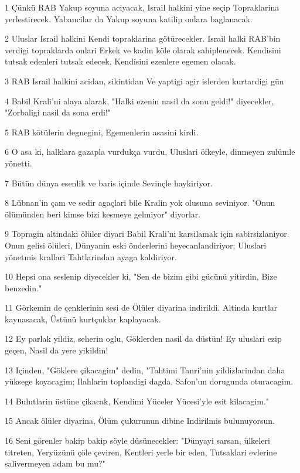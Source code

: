 \par 1 Çünkü RAB Yakup soyuna aciyacak, Israil halkini yine seçip Topraklarina yerlestirecek. Yabancilar da Yakup soyuna katilip onlara baglanacak.
\par 2 Uluslar Israil halkini Kendi topraklarina götürecekler. Israil halki RAB'bin verdigi topraklarda onlari Erkek ve kadin köle olarak sahiplenecek. Kendisini tutsak edenleri tutsak edecek, Kendisini ezenlere egemen olacak.
\par 3 RAB Israil halkini acidan, sikintidan Ve yaptigi agir islerden kurtardigi gün
\par 4 Babil Krali'ni alaya alarak, "Halki ezenin nasil da sonu geldi!" diyecekler, "Zorbaligi nasil da sona erdi!"
\par 5 RAB kötülerin degnegini, Egemenlerin asasini kirdi.
\par 6 O asa ki, halklara gazapla vurdukça vurdu, Uluslari öfkeyle, dinmeyen zulümle yönetti.
\par 7 Bütün dünya esenlik ve baris içinde Sevinçle haykiriyor.
\par 8 Lübnan'in çam ve sedir agaçlari bile Kralin yok olusuna seviniyor. "Onun ölümünden beri kimse bizi kesmeye gelmiyor" diyorlar.
\par 9 Topragin altindaki ölüler diyari Babil Krali'ni karsilamak için sabirsizlaniyor. Onun gelisi ölüleri, Dünyanin eski önderlerini heyecanlandiriyor; Uluslari yönetmis krallari Tahtlarindan ayaga kaldiriyor.
\par 10 Hepsi ona seslenip diyecekler ki, "Sen de bizim gibi gücünü yitirdin, Bize benzedin."
\par 11 Görkemin de çenklerinin sesi de Ölüler diyarina indirildi. Altinda kurtlar kaynasacak, Üstünü kurtçuklar kaplayacak.
\par 12 Ey parlak yildiz, seherin oglu, Göklerden nasil da düstün! Ey uluslari ezip geçen, Nasil da yere yikildin!
\par 13 Içinden, "Göklere çikacagim" dedin, "Tahtimi Tanri'nin yildizlarindan daha yüksege koyacagim; Ilahlarin toplandigi dagda, Safon'un dorugunda oturacagim.
\par 14 Bulutlarin üstüne çikacak, Kendimi Yüceler Yücesi'yle esit kilacagim."
\par 15 Ancak ölüler diyarina, Ölüm çukurunun dibine Indirilmis bulunuyorsun.
\par 16 Seni görenler bakip bakip söyle düsünecekler: "Dünyayi sarsan, ülkeleri titreten, Yeryüzünü çöle çeviren, Kentleri yerle bir eden, Tutsaklari evlerine salivermeyen adam bu mu?"
